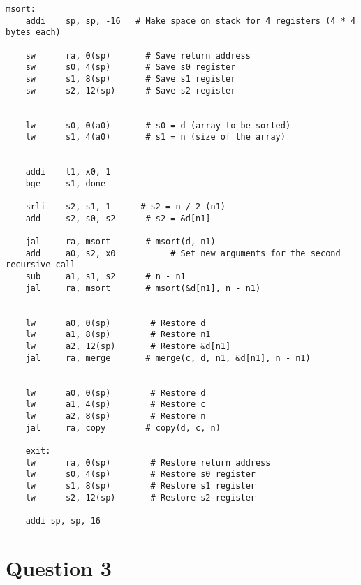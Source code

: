 \documentclass[12pt,letterpaper]{article}
\begin{document}
     \begin{lstlisting}[style = Python]
msort:
    addi 	sp, sp, -16   # Make space on stack for 4 registers (4 * 4 bytes each)

    sw 		ra, 0(sp)       # Save return address
    sw 		s0, 4(sp)       # Save s0 register
    sw 		s1, 8(sp)       # Save s1 register
    sw 		s2, 12(sp)      # Save s2 register


    lw 		s0, 0(a0)       # s0 = d (array to be sorted)
    lw		s1, 4(a0)       # s1 = n (size of the array)


    addi 	t1, x0, 1
    bge 	s1, done

    srli 	s2, s1, 1      # s2 = n / 2 (n1)
    add 	s2, s0, s2      # s2 = &d[n1]

    jal 	ra, msort       # msort(d, n1)
    add 	a0, s2, x0           # Set new arguments for the second recursive call
    sub 	a1, s1, s2      # n - n1
    jal 	ra, msort       # msort(&d[n1], n - n1)


    lw 		a0, 0(sp)        # Restore d
    lw 		a1, 8(sp)        # Restore n1
    lw 		a2, 12(sp)       # Restore &d[n1]
    jal 	ra, merge       # merge(c, d, n1, &d[n1], n - n1)


    lw 		a0, 0(sp)        # Restore d
    lw 		a1, 4(sp)        # Restore c
    lw 		a2, 8(sp)        # Restore n
    jal 	ra, copy        # copy(d, c, n)

    exit:
    lw 		ra, 0(sp)        # Restore return address
    lw 		s0, 4(sp)        # Restore s0 register
    lw 		s1, 8(sp)        # Restore s1 register
    lw 		s2, 12(sp)       # Restore s2 register

    addi sp, sp, 16

    \end{lstlisting}

\newpage
\section*{Question 3}
\end{document}
